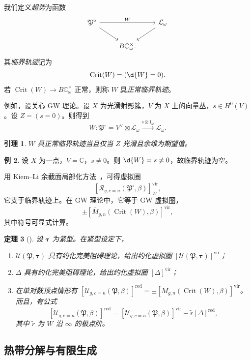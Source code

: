 \documentclass{amsart}
\newtheorem{thm}{定理}[section]
\newtheorem{lem}[thm]{引理}
\theoremstyle{definition}
\newtheorem{exm}[thm]{例}
\theoremstyle{remark}
\theoremstyle{plain}
\theoremstyle{definition}
\theoremstyle{remark}
\newcommand{\C}{\mathbb{C}}
\newcommand{\mc}[1]{\mathcal{#1}}
\newcommand{\mf}[1]{\mathfrak{#1}}
\newcommand{\mr}[1]{\mathrm{#1}}
\newcommand{\on}[1]{\operatorname{#1}}
\newcommand{\1}{\mathbf{1}}
\newcommand{\2}{\mathbf{2}}
\newcommand{\3}{\mathbf{3}}
\newcommand{\vir}{\mr{vir}}
\begin{document}
我们定义\textit{超势}为函数
\begin{equation*}
\begin{tikzcd}
    \mf{P}^{\circ} \ar{rr}{W} \ar{dr} && \mc{L}_{\omega} \ar{dl} \\
    & B \C_{\omega}^{\times}.
\end{tikzcd}
\end{equation*}
其\textit{临界轨迹}记为
\[ \on{Crit}(W) = (\d{W} = 0). \]
若 \(\on{Crit}(W) \to B\C_{\omega}^{\times}\) 正常，则称 \(W\) 具\textit{正常临界轨迹}。

例如，设关心 GW 理论。设 \(X\) 为光滑射影簇，\(V\) 为 \(X\) 上的向量丛，\(s \in H^0(V)\)。设 \(Z = (s = 0)\)。则得到
\[ W \colon \mf{P}^{\circ} = V^{\vee} \boxtimes \mc{L}_{\omega} \xrightarrow{s \otimes 1_{\omega}} \mc{L}_{\omega}. \]

\begin{lem}
    \(W\) 具正常临界轨迹当且仅当 \(Z\) 光滑且余维为期望值。
\end{lem}

\begin{exm}
    设 \(X\) 为一点，\(V = \C\)，\(s \neq 0\)。则 \(\d{W} = s \neq 0\)，故临界轨迹为空。
\end{exm}

用 Kiem--Li 余截面局部化方法~\cite{KiemLi2013}，可得虚拟圈
\[ [\mc{R}_{g, c=n}(\mf{P}^{\circ}, \beta)]_W^{\vir}, \]
它支于临界轨迹上。在 GW 理论中，它等于 GW 虚拟圈，
\[ \pm [\bar{M}_{g,n}(\on{Crit}(W), \beta)]^{\vir}, \]
其中符号可显式计算。

\begin{thm}[{\cite{CJR2021,CJW2021}}]
    设 \(\bm{\tau}\) 为紧型。在紧型设定下，
    \begin{enumerate}
        \item \(\mc{U}(\mf{P}, \bm{\tau})\) 具有约化完美阻碍理论，给出约化虚拟圈 \([\mc{U}(\mf{P}, \bm{\tau})]^{\vir}\)；
        \item \(\Delta\) 具有约化完美阻碍理论，给出约化虚拟圈 \([\Delta]^{\vir}\)；
        \item 在单对数顶点情形有 \([\mc{U}_{g, c=n}(\mf{P}, \beta)]^{\on{red}} = \pm [\bar{M}_{g,n}(\on{Crit}(W), \beta)]^{\vir}\)。而且，有公式
            \[ [\mc{U}_{g, c=n}(\mf{P}, \beta)]^{\on{red}} = [\mc{U}_{g, c=n}(\mf{P}, \beta)]^{\vir} - \tilde{r} [\Delta]^{\on{red}}, \]
            其中 \(\tilde{r}\) 为 \(W\) 沿 \(\infty\) 的极点阶。
    \end{enumerate}
\end{thm}

\subsection{热带分解与有限生成}%
\label{sub:Tropical decomposition and finite generation}
\end{document}
